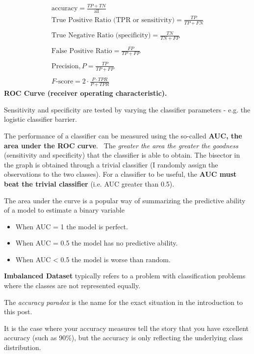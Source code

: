 \begin{gather*}
    \text{accuracy} =\frac{TP+TN}{\text{all}}\\
    \text{True Positive Ratio (TPR or sensitivity)} =\frac{TP}{TP+FN}\\
    \\
    \text{True Negative Ratio (specificity)} =\frac{TN}{TN+FP}\\
    \\
    \text{False Positive Ratio} =\frac{FP}{TP+FP}\\
    \\
    \text{Precision} ,P=\frac{TP}{TP+FP}\\
    \\
    F\text{-score} =2\cdot \frac{P\cdot TPR}{P+TPR}
\end{gather*}
\textbf{ROC Curve (receiver operating characteristic).}

Sensitivity and specificity are tested by varying the classifier parameters - e.g. the logistic classifier barrier.


The performance of a classifier can be measured using the so-called \textbf{AUC, the area under the ROC curve}. \ The \textit{greater the area the greater the goodness} (sensitivity and specificity) that the classifier is able to obtain. The bisector in the graph is obtained through a trivial classifier (I randomly assign the observations to the two classes). For a classifier to be useful, the \textbf{AUC must beat the trivial classifier} (i.e. AUC greater than 0.5).

The area under the curve is a popular way of summarizing the predictive ability of a model to estimate a binary variable
\begin{itemize}
    \item When AUC = 1 the model is perfect. 
    \item When AUC = 0.5 the model has no predictive ability.
    \item When AUC < 0.5 the model is worse than random.
\end{itemize}

\textbf{Imbalanced Dataset} typically refers to a problem with classification problems where the classes are not represented equally.

The \textit{accuracy paradox} is the name for the exact situation in the introduction to this post.

It is the case where your accuracy measures tell the story that you have excellent accuracy (such as 90\%), but the accuracy is only reflecting the underlying class distribution.

